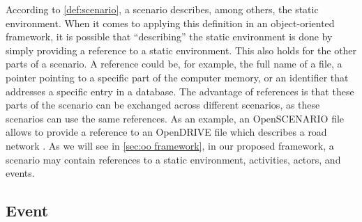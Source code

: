 

According to \cref{def:scenario}, a scenario describes, among others, the static environment. 
When it comes to applying this definition in an \cstartb object-oriented framework\cendb, it is possible that ``describing'' the static environment is done by simply providing a reference to a static environment. 
This also holds for the other parts of a scenario. 
A reference could be, for example, the full name of a file, a pointer pointing to a specific part of the computer memory, or an identifier that addresses a specific entry in a database.
The advantage of references is that these parts of the scenario can be exchanged across different scenarios, as these scenarios can use the same references. 
As an example, an OpenSCENARIO file allows to provide a reference to an OpenDRIVE file which describes a road network \autocite{dupuis2010opendrive}. As we will see in \cref{sec:oo framework}, in our proposed \cstartb framework\cendb, a scenario may contain references to a static environment, activities, actors, and events.

\cstartb 


\subsection{Event}
\label{sec:event}

